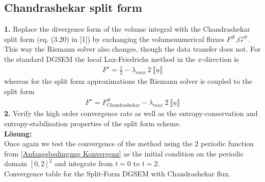 \documentclass[11pt]{scrartcl}
\begin{document}
\subsection{Chandrashekar split form}
\textbf{1.} Replace the divergence form of the volume integral with the Chandrashekar split form (eq.  (3.20) in [1]) by exchanging the volumenumerical fluxes $F^\#$,$G^\#$. This way the Riemann solver also changes, though the data transfer does not. For the standard DGSEM the local Lax-Friedrichs method in the $x$-direction is 
\begin{align}
F^{\star} =\frac{1}{2}- \lambda_{max} \ 2 \ \llbracket \underline{u} \rrbracket
\end{align}
whereas for the split form approximations the Riemann solver is coupled to the split form
\begin{align}
\label{riemannsplit}
 F^{\star} = F^\#_{\text{Chandrashekar}} - \lambda_{max} \ 2 \ \llbracket \underline{u} \rrbracket
\end{align}
\textbf{2.} Verify the high order convergence rate as well as the entropy-conservation and entropy-stabilisation properties of the split form scheme. \\
\newline
\textbf{Lösung:} \\
Once again we test the convergence of the method using the $2$ periodic function from \ref{Anfangsbedingung Konvergenz} as the initial condition on the periodic domain $[0, 2]^2$ and integrate from $t=0$ to $t=2$.\\

Convergence table for the Split-Form DGSEM with Chandrashekar flux.
\end{document}
